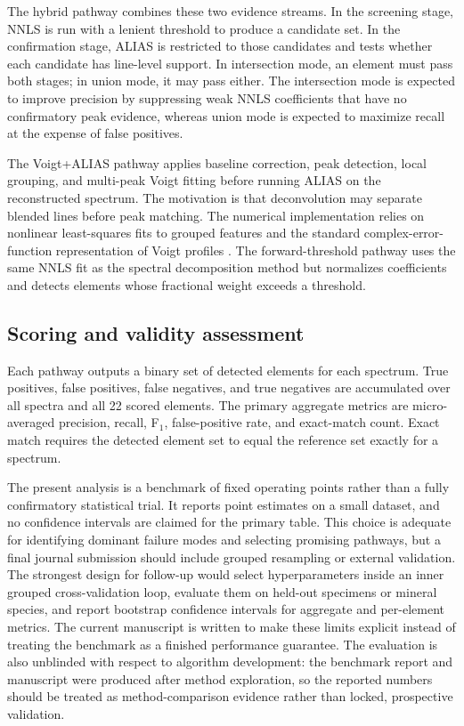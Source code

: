 \documentclass[preprint,12pt,authoryear]{elsarticle}
\begin{document}
The hybrid pathway combines these two evidence streams. In the screening stage, NNLS is run with a lenient threshold to produce a candidate set. In the confirmation stage, ALIAS is restricted to those candidates and tests whether each candidate has line-level support. In intersection mode, an element must pass both stages; in union mode, it may pass either. The intersection mode is expected to improve precision by suppressing weak NNLS coefficients that have no confirmatory peak evidence, whereas union mode is expected to maximize recall at the expense of false positives.

The Voigt+ALIAS pathway applies baseline correction, peak detection, local grouping, and multi-peak Voigt fitting before running ALIAS on the reconstructed spectrum. The motivation is that deconvolution may separate blended lines before peak matching. The numerical implementation relies on nonlinear least-squares fits to grouped features and the standard complex-error-function representation of Voigt profiles \citep{Weideman1994}. The forward-threshold pathway uses the same NNLS fit as the spectral decomposition method but normalizes coefficients and detects elements whose fractional weight exceeds a threshold.

\subsection{Scoring and validity assessment}

Each pathway outputs a binary set of detected elements for each spectrum. True positives, false positives, false negatives, and true negatives are accumulated over all spectra and all 22 scored elements. The primary aggregate metrics are micro-averaged precision, recall, F$_1$, false-positive rate, and exact-match count. Exact match requires the detected element set to equal the reference set exactly for a spectrum.

The present analysis is a benchmark of fixed operating points rather than a fully confirmatory statistical trial. It reports point estimates on a small dataset, and no confidence intervals are claimed for the primary table. This choice is adequate for identifying dominant failure modes and selecting promising pathways, but a final journal submission should include grouped resampling or external validation. The strongest design for follow-up would select hyperparameters inside an inner grouped cross-validation loop, evaluate them on held-out specimens or mineral species, and report bootstrap confidence intervals for aggregate and per-element metrics. The current manuscript is written to make these limits explicit instead of treating the benchmark as a finished performance guarantee. The evaluation is also unblinded with respect to algorithm development: the benchmark report and manuscript were produced after method exploration, so the reported numbers should be treated as method-comparison evidence rather than locked, prospective validation.
\end{document}
